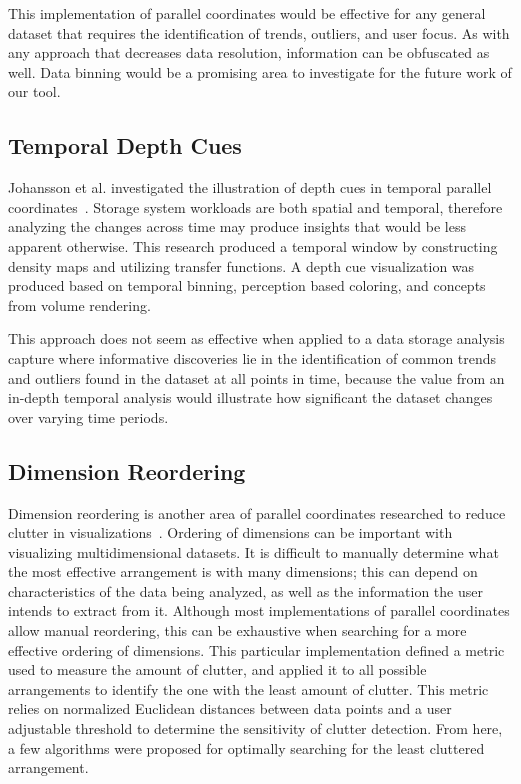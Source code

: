 \documentclass[journal]{vgtc}                %
\begin{document}
This implementation of parallel coordinates would be effective for any general dataset that requires the identification of trends, outliers, and user focus. As with any approach that decreases data resolution, information can be obfuscated as well. Data binning would be a promising area to investigate for the future work of our tool.

\subsection{Temporal Depth Cues}
\label{temporal_depth_cues}

Johansson et al. investigated the illustration of depth cues in temporal parallel coordinates~\cite{johansson:2007:DCDTPC}. Storage system workloads are both spatial and temporal, therefore analyzing the changes across time may produce insights that would be less apparent otherwise. This research produced a temporal window by constructing density maps and utilizing transfer functions. A depth cue visualization was produced based on temporal binning, perception based coloring, and concepts from volume rendering.

This approach does not seem as effective when applied to a data storage analysis capture where informative discoveries lie in the identification of common trends and outliers found in the dataset at all points in time, because the value from an in-depth temporal analysis would illustrate how significant the dataset changes over varying time periods.

\subsection{Dimension Reordering}
\label{dimensional_reordering}
Dimension reordering is another area of parallel coordinates researched to reduce clutter in visualizations~\cite{peng:2005:CRMD}. Ordering of dimensions can be important with visualizing multidimensional datasets. It is difficult to manually determine what the most effective arrangement is with many dimensions; this can depend on characteristics of the data being analyzed, as well as the information the user intends to extract from it. Although most implementations of parallel coordinates allow manual reordering, this can be exhaustive when searching for a more effective ordering of dimensions. This particular implementation defined a metric used to measure the amount of clutter, and applied it to all possible arrangements to identify the one with the least amount of clutter. This metric relies on normalized Euclidean distances between data points and a user adjustable threshold to determine the sensitivity of clutter detection. From here, a few algorithms were proposed for optimally searching for the least cluttered arrangement. 
\end{document}
